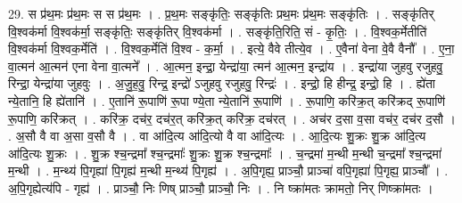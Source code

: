 \documentclass[17pt]{extarticle}
\begin{document}
29. स प्र॑थ॒मः प्र॑थ॒मः स स प्र॑थ॒मः । . प्र॒थ॒मः सङ्कृ॑तिः॒ सङ्कृ॑तिः प्रथ॒मः प्र॑थ॒मः सङ्कृ॑तिः । . सङ्कृ॑तिर् वि॒श्वक॑र्मा वि॒श्वक॑र्मा॒ सङ्कृ॑तिः॒ सङ्कृ॑तिर् वि॒श्वक॑र्मा । . सङ्कृ॑ति॒रिति॒ सं - कृ॒तिः॒ । . वि॒श्वक॒र्मेतीति॑ वि॒श्वक॑र्मा वि॒श्वक॒र्मेति॑ । . वि॒श्वक॒र्मेति॑ वि॒श्व - क॒र्मा॒ । . इत्ये॒ वैवे तीत्ये॒व । . ए॒वैना॑ वेना वे॒वै वैनौ᳚ । . ए॒ना॒ वा॒त्मन॑ आ॒त्मन॑ एना वेना वा॒त्मने᳚ । . आ॒त्मन॒ इन्द्रा॒ येन्द्रा॑या॒ त्मन॑ आ॒त्मन॒ इन्द्रा॑य । . इन्द्रा॑या जुहवु रजुहवु॒ रिन्द्रा॒ येन्द्रा॑या जुहवुः । . अ॒जु॒ह॒वु॒ रिन्द्र॒ इन्द्रो॑ ऽजुहवु रजुहवु॒ रिन्द्रः॑ । . इन्द्रो॒ हि हीन्द्र॒ इन्द्रो॒ हि । . ह्ये॑ता न्ये॒तानि॒ हि ह्ये॑तानि॑ । . ए॒तानि॑ रू॒पाणि॑ रू॒पा ण्ये॒ता न्ये॒तानि॑ रू॒पाणि॑ । . रू॒पाणि॒ करि॑क्र॒त् करि॑क्रद् रू॒पाणि॑ रू॒पाणि॒ करि॑क्रत् । . करि॑क्र॒ दच॑र॒ दच॑र॒त् करि॑क्र॒त् करि॑क्र॒ दच॑रत् । . अच॑र द॒सा व॒सा वच॑र॒ दच॑र द॒सौ । . अ॒सौ वै वा अ॒सा व॒सौ वै । . वा आ॑दि॒त्य आ॑दि॒त्यो वै वा आ॑दि॒त्यः । . आ॒दि॒त्यः शु॒क्रः शु॒क्र आ॑दि॒त्य आ॑दि॒त्यः शु॒क्रः । . शु॒क्र श्च॒न्द्रमा᳚ श्च॒न्द्रमाः᳚ शु॒क्रः शु॒क्र श्च॒न्द्रमाः᳚ । . च॒न्द्रमा॑ म॒न्थी म॒न्थी च॒न्द्रमा᳚ श्च॒न्द्रमा॑ म॒न्थी । . म॒न्थ्य॑ पि॒गृह्या॑ पि॒गृह्य॑ म॒न्थी म॒न्थ्य॑ पि॒गृह्य॑ । . अ॒पि॒गृह्य॒ प्राञ्चौ॒ प्राञ्चा॑ वपि॒गृह्या॑ पि॒गृह्य॒ प्राञ्चौ᳚ । . अ॒पि॒गृह्येत्य॑पि - गृह्य॑ । . प्राञ्चौ॒ निः णिष् प्राञ्चौ॒ प्राञ्चौ॒ निः । . नि ष्क्रा॑मतः क्रामतो॒ निर् णिष्क्रा॑मतः । \newline
\end{document}
